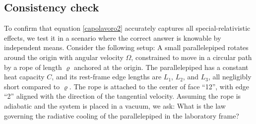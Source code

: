 \documentclass[a4paper, amsfonts, amssymb, amsmath, reprint, showkeys, nofootinbib, twoside, onecolumn,notitlepage]{revtex4-1}
\theoremstyle{definition}
\theoremstyle{theorem}
\begin{document}
\vspace{-0.2cm}
\subsection{Consistency check}
\vspace{-0.2cm}

To confirm that equation \eqref{capolavoro2} accurately captures all special-relativistic effects, we test it in a scenario where the correct answer is knowable by independent means. Consider the following setup: A small parallelepiped rotates around the origin with angular velocity $\Omega$, constrained to move in a circular path by a rope of length $\varrho$ anchored at the origin. The parallelepiped has a constant heat capacity $C$, and its rest-frame edge lengths are $L_1$, $L_2$, and $L_3$,  all negligibly short compared to $\varrho$. The rope is attached to the center of face ``12'', with edge ``2'' aligned with the direction of the tangential velocity. Assuming the rope is adiabatic and the system is placed in a vacuum, we ask: What is the law governing the radiative cooling of the parallelepiped in the laboratory frame?
\end{document}
